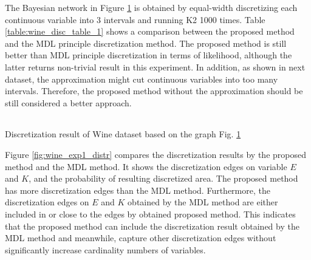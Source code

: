 The Bayesian network in Figure \ref{fig:wine_graph_1} is obtained by equal-width discretizing each continuous variable into 3 intervals and running K2 1000 times. Table \ref{table:wine_disc_table_1} shows a comparison between the proposed method and the MDL principle discretization method.
The proposed method is still better than MDL principle discretization in terms of likelihood, although the latter returns non-trivial result in this experiment.
In addition, as shown in next dataset, the approximation might cut continuous variables into too many intervals. Therefore, the proposed method without the approximation should be still considered a better approach.


\begin{figure}[ht]
  \centering
    \begin{tabular}{cc}
      
    \end{tabular}
  \caption{}
  \label{fig:wine_graph_1}
\end{figure}

\begin{table}
  \centering
  \scalebox{1.0}{
  
  }
  \caption{Discretization result of Wine dataset based on the graph Fig. \ref{fig:wine_graph_1}
  }
  \label{table:wine_disc_table_1}
\end{table}

Figure \ref{fig:wine_exp1_distr} compares the discretization results by the proposed method and the MDL method. It shows the discretization edges on variable $E$ and $K$, and the probability of resulting discretized area. The proposed method has more discretization edges than the MDL method. Furthermore, the discretization edges on $E$ and $K$ obtained by the MDL method are either included in or close to the edges by obtained proposed method. This indicates that the proposed method can include the discretization result obtained by the MDL method and meanwhile, capture other discretization edges without significantly increase cardinality numbers of variables.

